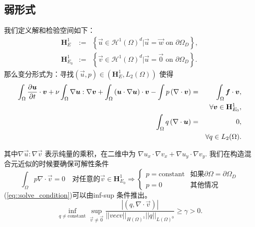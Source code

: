     \subsection{弱形式}
        我们定义解和检验空间如下：
        \begin{eqnarray}
            \mathbf{H}_E^1 & := & \left\{ \vec{u} \in \mathcal{H}^1(\Omega)^d \big|
            \vec{u} = \vec{w} \mbox{ on } \partial \Omega_D \right\},\\
            \mathbf{H}_{E_0}^1 & := & \left\{ \vec{v} \in \mathcal{H}^1(\Omega)^d \big|
            \vec{u} = \vec{0} \mbox{ on } \partial \Omega_D \right\}.
        \end{eqnarray}
        那么变分形式为：寻找$(\vec{u}, p) \in (\mathbf{H}_E^1,
        L_2(\Omega))$ 使得
        \begin{eqnarray}
             \int_{\Omega}\frac{\partial \vec{u}}{\partial t} \cdot \vec{v} +
            \nu \int_\Omega \nabla \vec{u} : \nabla \vec{v} + \int_\Omega \left(
            \vec{u} \cdot \nabla \vec{u} \right) \cdot \vec{v} - \int p
            \left( \nabla \cdot \vec{v} \right) & = & \int_\Omega \vec{f} \cdot
            \vec{v}, \label{eq::generalweak_momentum}\\
             & & \forall \vec{v} \in \mathbf{H}_{E_0}^1,\notag \\
             \int_\Omega q \left( \nabla \cdot \vec{u} \right) & = & 0,
             \label{eq::generalweak_mass} \\
            & & \forall q \in L_2(\Omega). \notag
       \end{eqnarray}

       其中$\nabla \vec{u} : \nabla \vec{v}$ 表示纯量的乘积，在二维中为
       $\nabla u_x \cdot \nabla v_x + \nabla u_y \cdot \nabla v_y$.
       我们在构造混合元近似的时候要确保可解性条件
       \begin{equation}
            \int_{\Omega}p \nabla \cdot \vec{v} = 0 \quad \text{对任意的}\vec{v} \in \mathbf{H}_{E_0}^1 \Rightarrow \left\{ \begin{array}{ll}
                p = \mbox{constant} & \text{如果} \partial \Omega = \partial \Omega_D \\
                p = 0 & \text{其他情况}
            \end{array}
            \right.
            \label{eq::solve_condition}
       \end{equation}
        (\ref{eq::solve_condition})可以由inf-sup 条件推出。
        \begin{equation}
            \inf_{ q \neq \mbox{constant}} \sup_{\vec{v} \neq \vec{0}} \frac{|(q, \nabla \cdot \vec{v})|}{||vec{v}||_{H(\Omega)^1} ||q||_{L(\Omega)^0}} \geq \gamma > 0.
        \end{equation}

